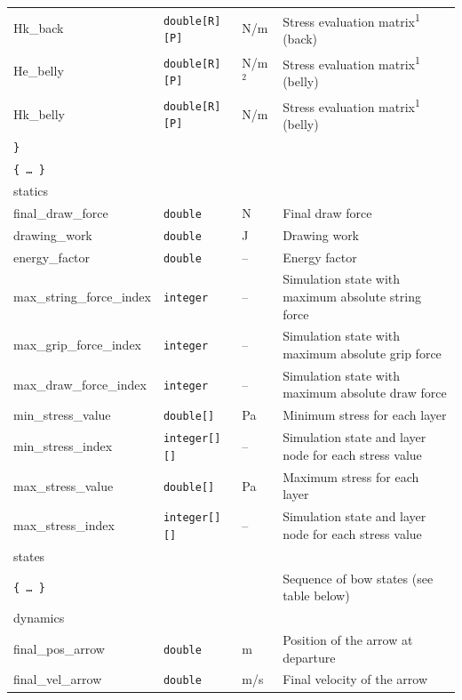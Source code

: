 \documentclass[12pt]{article}
\begin{document}
\begin{table}[H]
{\begin{tabular}{ l | l | l | l }
\quad\quad\quad\quad Hk\_back & \texttt{double[R][P]} & \unit[]{N/m} & Stress evaluation matrix\textsuperscript{1} (back) \\
\quad\quad\quad\quad He\_belly & \texttt{double[R][P]} & \unit[]{N/m$^2$} & Stress evaluation matrix\textsuperscript{1} (belly) \\
\quad\quad\quad\quad Hk\_belly & \texttt{double[R][P]} & \unit[]{N/m} & Stress evaluation matrix\textsuperscript{1} (belly) \\
\quad\quad\quad \texttt{\}} & & & \\
\quad\quad\quad \texttt{\{\ \ldots\ \}} & & & \\
\tablespace statics & & & \\
\quad final\_draw\_force & \texttt{double} & \unit[]{N} & Final draw force \\
\quad drawing\_work & \texttt{double} & \unit[]{J} & Drawing work \\
\quad energy\_factor & \texttt{double} & -- & Energy factor \\
\quad max\_string\_force\_index & \texttt{integer} & -- & Simulation state with maximum absolute string force \\
\quad max\_grip\_force\_index & \texttt{integer} & -- & Simulation state with maximum absolute grip force \\
\quad max\_draw\_force\_index  & \texttt{integer} & -- & Simulation state with maximum absolute draw force \\
\quad min\_stress\_value & \texttt{double[]} & \unit[]{Pa} & Minimum stress for each layer \\
\quad min\_stress\_index & \texttt{integer[][]} & -- & Simulation state and layer node for each stress value \\
\quad max\_stress\_value & \texttt{double[]} & \unit[]{Pa} & Maximum stress for each layer \\
\quad max\_stress\_index & \texttt{integer[][]} & -- & Simulation state and layer node for each stress value \\
\quad states & & & \\
\quad\quad \texttt{\{\ \ldots\ \}} & & & Sequence of bow states (see table below) \\
\tablespace dynamics & & & \\
\quad final\_pos\_arrow & \texttt{double} & \unit[]{m} & Position of the arrow at departure\\
\quad final\_vel\_arrow & \texttt{double} & \unit[]{m/s} & Final velocity of the arrow \\

\end{tabular}}
\end{table}
\end{document}
